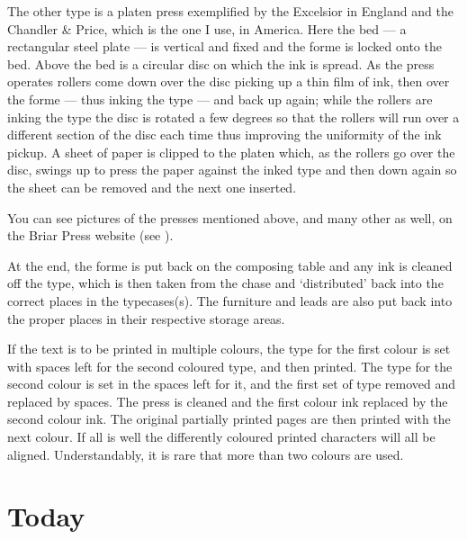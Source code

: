 \documentclass[10pt,a4paper,extrafontsizes]{memoir}
\begin{document}
\begin{paracol}{2}
    The other type is a platen press 
exemplified by the Excelsior in England 
and the Chandler \& Price, which 
is the one I use, in America. Here the bed --- a rectangular steel plate ---
is vertical and fixed and the forme is locked onto the bed. Above the bed
is a circular disc on which the ink is spread. As the press operates rollers
come down over the disc picking up a thin film of ink, 
then over the forme --- thus inking the type ---
and back up again; while the rollers are inking the type the disc is
rotated a few degrees so that the rollers will run over a different section 
of the disc each time thus improving the uniformity of the ink pickup. 
A sheet of paper is clipped to the platen which, as the 
rollers go over the disc, swings up to press the paper against the inked type
and then down again so the sheet can be removed and the next one inserted.

    You can see pictures of the presses mentioned above, and many other as 
well, on the 
Briar Press website (see ).

    At the end, the forme is put back on the composing table and any ink 
is cleaned off the type, which is then taken from the chase 
and `distributed' back into
the correct places in the typecases(s). The furniture and
leads are also put back into the proper places in their respective
storage areas.

    If the text is to be printed in multiple colours, the type for the first
colour is set with spaces left for the second coloured type, and then printed.
The type for the second colour is set in the spaces left for it, and the first
set of type removed and replaced by spaces. The press is cleaned and the first
colour ink replaced by the second colour ink. The original partially printed
pages are then printed with the next colour. If all is well the differently
coloured printed characters will all be aligned. Understandably, it is rare 
that more than two colours are used.
\end{paracol}

\section{Today}
\end{document}
